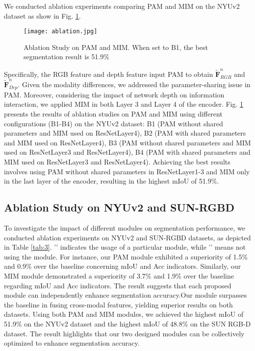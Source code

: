 \documentclass{aims}
\numberwithin{equation}{section}
\begin{document}
We conducted ablation experiments comparing PAM and MIM on the NYUv2 dataset as show in Fig. \ref{fig:Ablation}.
\begin{figure}[!htb]
	\centering
\texttt{[image: ablation.jpg]}
\caption{Ablation Study on PAM and MIM. When set to B1, the best segmentation result is 51.9\%\label{fig:Ablation}}
\end{figure}
Specifically, the RGB feature and depth feature input PAM to obtain $\tilde{\bm F}_{RGB}^{n}$ and $\tilde{\bm F}_{Dep}^{n}$. Given the modality differences, we addressed the parameter-sharing issue in PAM. Moreover, considering the impact of network depth on information interaction, we applied MIM in both Layer 3 and Layer 4 of the encoder. Fig. \ref{fig:Ablation} presents the results of ablation studies on PAM and MIM using different configurations (B1-B4) on the NYUv2 dataset: B1 (PAM without shared parameters and MIM used on ResNetLayer4), B2 (PAM with shared parameters and MIM used on ResNetLayer4), B3 (PAM without shared parameters and MIM used on ResNetLayer3 and ResNetLayer4), B4 (PAM with shared parameters and MIM used on ResNetLayer3 and ResNetLayer4). Achieving the best results involves using PAM without shared parameters in ResNetLayer1-3 and MIM only in the last layer of the encoder, resulting in the highest mIoU of 51.9\%.
\subsection{Ablation Study on NYUv2 and SUN-RGBD}
To investigate the impact of different modules on segmentation performance, we conducted ablation experiments on NYUv2 and SUN-RGBD datasets, as depicted in Table \ref{tab:3}. '' indicates the usage of a particular module, while '' means not using the module. For instance, our PAM module exhibited a superiority of 1.5\% and 0.9\% over the baseline concerning mIoU and Acc indicators. Similarly, our MIM module demonstrated a superiority of 3.7\% and 1.9\% over the baseline regarding mIoU and Acc indicators. The result suggests that each proposed module can independently enhance segmentation accuracy.Our module surpasses the baseline in fusing cross-modal features, yielding superior results on both datasets. Using both PAM and MIM modules, we achieved the highest mIoU of 51.9\% on the NYUv2 dataset and the highest mIoU of 48.8\% on the SUN RGB-D dataset. The result highlights that our two designed modules can be collectively optimized to enhance segmentation accuracy.
\end{document}
